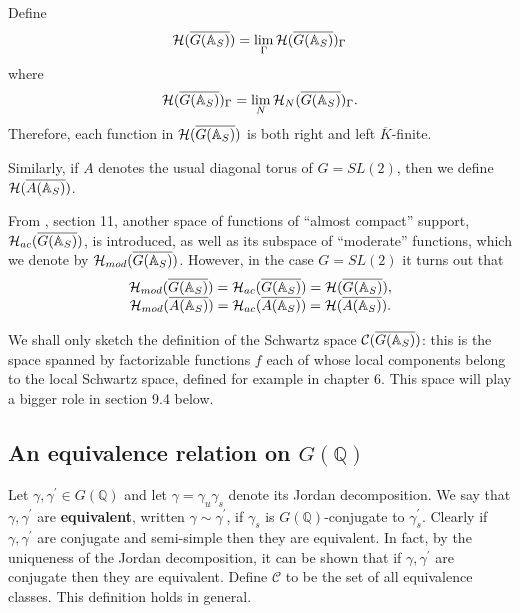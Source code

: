 Define
\[
{\cal{H}}(\overline{G({\mathbb{A}}_S)})=\lim_{\Gamma}
{\cal{H}}(\overline{G({\mathbb{A}}_S)})_\Gamma
\]
where
\[
{\cal{H}}(\overline{G({\mathbb{A}}_S)})_\Gamma =\lim_{N}
{\cal{H}}_N(\overline{G({\mathbb{A}}_S)})_\Gamma .
\]
Therefore, each function in
${\cal{H}}(\overline{G({\mathbb{A}}_S)})$
is both right and left $\overline{K}$-finite.

Similarly, if $A$ denotes the usual
diagonal torus of $G=SL(2)$, then we define
${\cal{H}}(\overline{A({\mathbb{A}}_S)})$.

From \cite{A11}, section 11, another space of functions of
``almost compact'' support,
${\cal{H}}_{ac}(\overline{G({\mathbb{A}}_S)})$, is introduced,
as well as its subspace of ``moderate'' functions,
which we denote by
${\cal{H}}_{mod}(\overline{G({\mathbb{A}}_S)})$.
However, in the case $G=SL(2)$ it turns out that
\[
\begin{array}{c}
{\cal{H}}_{mod}(\overline{G({\mathbb{A}}_S)})=
{\cal{H}}_{ac}(\overline{G({\mathbb{A}}_S)})=
{\cal{H}}(\overline{G({\mathbb{A}}_S)}),\\  
{\cal{H}}_{mod}(\overline{A({\mathbb{A}}_S)})=
{\cal{H}}_{ac}(\overline{A({\mathbb{A}}_S)})=
{\cal{H}}(\overline{A({\mathbb{A}}_S)}).
\end{array}
\]

We shall only sketch the definition of the Schwartz
space ${\cal{C}}(\overline{G({\mathbb{A}}_S)})$: this is the space spanned by
factorizable functions $f$ each of whose local components
belong to the local Schwartz space, defined for example
in chapter 6. This space will play a bigger role in section 9.4 below.

\subsection{An equivalence relation on $G({\mathbb{Q}})$}

Let $\gamma ,\gamma ^{\prime }\in G({\mathbb{Q}})$ and let
$\gamma =\gamma_u\gamma _s$ denote its Jordan decomposition.
We say that $\gamma ,\gamma^{\prime }$ are \textbf{equivalent},
written $\gamma \sim \gamma ^{\prime }$,
if $\gamma _s$ is $G({\mathbb{Q}})$-conjugate to
$\gamma _s^{\prime }$. Clearly
if $\gamma ,\gamma ^{\prime }$ are conjugate and
semi-simple then they are
equivalent. In fact, by the uniqueness of the Jordan decomposition, it can
be shown that if $\gamma ,\gamma ^{\prime }$ are conjugate then they are
equivalent. Define $\mathcal{C}$ to be the set of all equivalence classes.
This definition holds in general.

